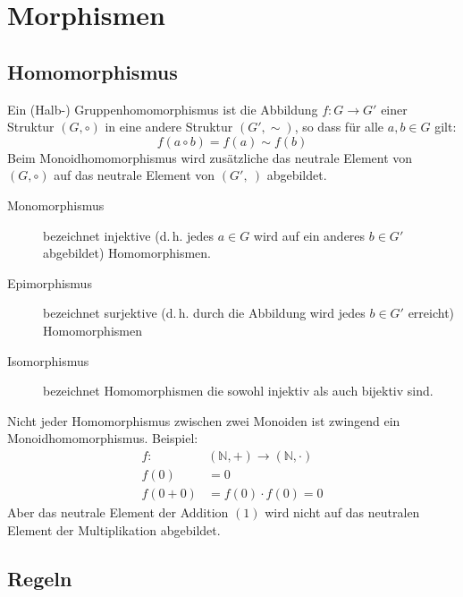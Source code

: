 \section{Morphismen}
\subsection{Homomorphismus}
Ein (Halb-) Gruppenhomomorphismus ist die Abbildung $f: G \rightarrow G'$ einer Struktur $(G, \circ)$ in eine andere Struktur $(G', \sim)$, so dass für alle $a, b \in G$ gilt:
\begin{equation*}
	f(a \circ b) = f(a) \sim f(b)
\end{equation*}
Beim Monoidhomomorphismus wird zusätzliche das neutrale Element von $(G, \circ)$ auf das neutrale Element von $(G', ~)$ abgebildet.

\begin{description}
	\item [Monomorphismus] bezeichnet injektive (d.\,h. jedes $a \in G$ wird auf ein anderes $b \in G'$ abgebildet) Homomorphismen.
	\item [Epimorphismus] bezeichnet surjektive (d.\,h. durch die Abbildung wird jedes $b \in G'$ erreicht) Homomorphismen
	\item [Isomorphismus] bezeichnet Homomorphismen die sowohl injektiv als auch bijektiv sind.
\end{description}

Nicht jeder Homomorphismus zwischen zwei Monoiden ist zwingend ein Monoidhomomorphismus.
Beispiel: 
\begin{align*}
f:& (\mathbb{N}, +) \rightarrow (\mathbb{N}, \cdot)	\\
f(0)& = 0\\
f(0 + 0)& = f(0) \cdot f(0) = 0
\end{align*}
Aber das neutrale Element der Addition $(1)$ wird nicht auf das neutralen Element der Multiplikation abgebildet.


\subsection{Regeln}

